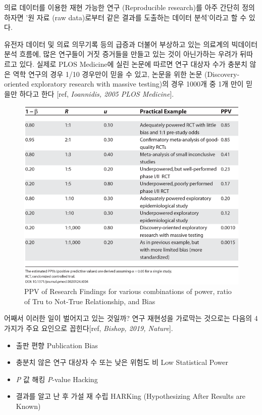 \documentclass[]{book}
\providecommand{\tightlist}{%
  \setlength{\itemsep}{0pt}\setlength{\parskip}{0pt}}
\begin{document}
의료 데이터를 이용한 재현 가능한 연구 (Reproducible research)를 아주 간단히 정의하자면 '원 자료 (raw data)로부터 같은 결과를 도출하는 데이터 분석'이라고 할 수 있다.

유전자 데이터 및 의료 의무기록 등의 급증과 더불어 부상하고 있는 의료계의 빅데이터 분석 흐름에, 많은 연구들이 거짓 증거들을 만들고 있는 것이 아닌가하는 우려가 뒤따르고 있다. 실제로 PLOS Medicine에 실린 논문에 따르면 연구 대상자 수가 충분치 않은 역학 연구의 경우 1/10 경우만이 믿을 수 있고, 논문을 위한 논문 (Discovery-oriented exploratory research with massive testing)의 경우 1000개 중 1개 만이 믿을만 하다고 한다 {[}ref, \emph{Ioannidis, 2005 PLOS Medicine}{]}.

\begin{figure}
\includegraphics[width=0.8\linewidth]{images/OhdsiCommunity/journal.pmed.0020124.t004} \caption{PPV of Research Findings for various combinations of power, ratio of Tru to Not-True Relationship, and Bias}\label{fig:whyMostPublishedResarchFindingsAreFalse}
\end{figure}

어째서 이러한 일이 벌어지고 있는 것일까? 연구 재현성을 가로막는 것으로는 다음의 4가지가 주요 요인으로 꼽힌다{[}ref, \emph{Bishop, 2019, Nature}{]}.

\begin{itemize}
\tightlist
\item
  출판 편향 Publication Bias
\item
  충분치 않은 연구 대상자 수 또는 낮은 위험도 비 Low Statistical Power
\item
  \emph{P} 값 해킹 \emph{P}-value Hacking
\item
  결과를 알고 난 후 가설 재 수립 HARKing (Hypothesizing After Results are Known)
\end{itemize}
\end{document}
